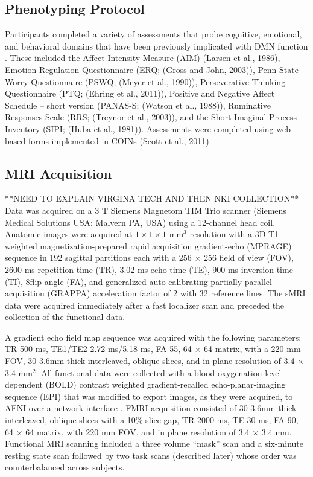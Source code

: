 \subsection{Phenotyping Protocol}
Participants completed a variety of assessments that probe cognitive, emotional, and behavioral domains that have been previously implicated with DMN function \cite{Andrews_Hanna_2014,Buckner_2008,Hamilton_2011,Sheline_2009}. These included the Affect Intensity Measure (AIM) (Larsen et al., 1986), Emotion Regulation Questionnaire (ERQ; (Gross and John, 2003)), Penn State Worry Questionnaire (PSWQ; (Meyer et al., 1990)), Perseverative Thinking Questionnaire (PTQ; (Ehring et al., 2011)), Positive and Negative Affect Schedule -- short version (PANAS-S; (Watson et al., 1988)), Ruminative Responses Scale (RRS; (Treynor et al., 2003)), and the Short Imaginal Process Inventory (SIPI; (Huba et al., 1981)). Assessments were completed using web-based forms implemented in COINs (Scott et al., 2011). 

\subsection{MRI Acquisition}
**NEED TO EXPLAIN VIRGINA TECH AND THEN NKI COLLECTION**
Data was acquired on a 3 T Siemens Magnetom TIM Trio scanner (Siemens Medical Solutions USA: Malvern PA, USA) using a 12-channel head coil. Anatomic images were acquired at $1 \times 1 \times 1$ mm$^{3}$ resolution with a 3D T1-weighted magnetization-prepared rapid acquisition gradient-echo (MPRAGE) sequence \cite{Mugler_1990} in 192 sagittal partitions each with a 256 $\times$ 256 field of view (FOV), 2600 ms repetition time (TR), 3.02 ms echo time (TE), 900 ms inversion time (TI), 8\textdegree flip angle (FA), and generalized auto-calibrating partially parallel acquisition (GRAPPA) \cite{Griswold_2002} acceleration factor of 2 with 32 reference lines. The sMRI data were acquired immediately after a fast localizer scan and preceded the collection of the functional data. 

A gradient echo field map sequence was acquired with the following parameters: TR 500 ms, TE1/TE2 2.72 ms/5.18 ms, FA 55\textdegree, 64 $\times$ 64 matrix, with a 220 mm FOV, 30 3.6mm thick interleaved, oblique slices, and in plane resolution of 3.4 $\times$ 3.4 mm$^{2}$. All functional data were collected with a blood oxygenation level dependent (BOLD) contrast weighted gradient-recalled echo-planar-imaging sequence (EPI) that was modified to export images, as they were acquired, to AFNI over a network interface \cite{Cox_1995,Cox_1996,LaConte_2007}. FMRI acquisition consisted of 30 3.6mm thick interleaved, oblique slices with a 10\% slice gap, TR 2000 ms, TE 30 ms, FA 90\textdegree, 64 $\times$ 64 matrix, with 220 mm FOV, and in plane resolution of 3.4 $\times$ 3.4 mm. Functional MRI scanning included a three volume ``mask'' scan and a six-minute resting state scan followed by two task scans (described later) whose order was counterbalanced across subjects.

